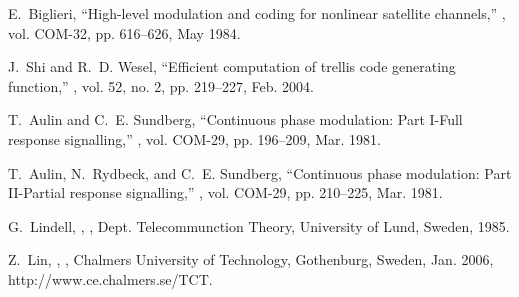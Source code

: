 \documentclass[12pt,twoside,onecolumn,a4paper,english]{IEEEtran2e}
\begin{document}
\begin{thebibliography}{10}
E.~Biglieri,
\newblock ``High-level modulation and coding for nonlinear satellite
  channels,''
, vol. COM-32, pp. 616--626, May 1984.

J.~Shi and R.~D. Wesel,
\newblock ``Efficient computation of trellis code generating function,''
, vol. 52, no. 2, pp. 219--227, Feb. 2004.

T.~Aulin and C.~E. Sundberg,
\newblock ``{Continuous phase modulation: Part I-Full response signalling},''
, vol. COM-29, pp. 196--209, Mar. 1981.

T.~Aulin, N.~Rydbeck, and C.~E. Sundberg,
\newblock ``{Continuous phase modulation: Part II-Partial response
  signalling},''
, vol. COM-29, pp. 210--225, Mar. 1981.

G.~Lindell,
,
, Dept. Telecommunction Theory, University of Lund,
  Sweden, 1985.

Z.~Lin,
,
, Chalmers University of Technology, Gothenburg, Sweden,
  Jan. 2006,
\newblock http://www.ce.chalmers.se/TCT.

\end{thebibliography}
\end{document}
